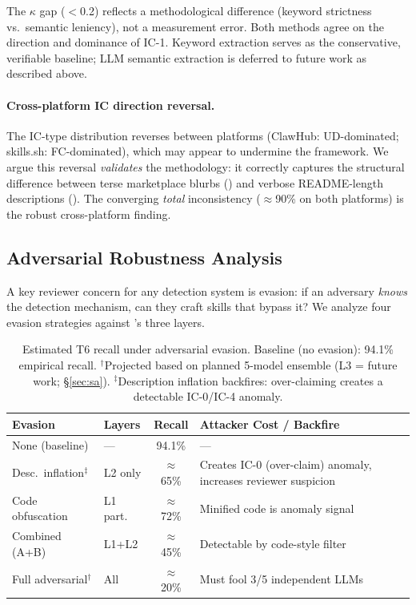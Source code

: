 The $\kappa$ gap ($<$0.2) reflects a methodological difference
(keyword strictness vs.\ semantic leniency), not a measurement error.
Both methods agree on the direction and dominance of IC-1.
Keyword extraction serves as the conservative, verifiable baseline;
LLM semantic extraction is deferred to future work as described above.

\paragraph{Cross-platform IC direction reversal.}
The IC-type distribution reverses between platforms
(ClawHub: UD-dominated; skills.sh: FC-dominated),
which may appear to undermine the framework.
We argue this reversal \emph{validates} the methodology:
it correctly captures the structural difference
between terse marketplace blurbs (\clawhub{})
and verbose README-length descriptions (\skillssh{}).
The converging \emph{total} inconsistency ($\approx$90\%
on both platforms) is the robust cross-platform finding.

\subsection{Adversarial Robustness Analysis}
\label{sec:evasion}

A key reviewer concern for any detection system is evasion:
if an adversary \emph{knows} the detection mechanism,
can they craft skills that bypass it?
We analyze four evasion strategies against \sysname's three layers.

\begin{table}[h]
\centering
\small
\setlength{\tabcolsep}{4pt}
\caption{Estimated T6 recall under adversarial evasion.
Baseline (no evasion): 94.1\% empirical recall.
$^\dagger$Projected based on planned 5-model ensemble (L3 = future work; \S\ref{sec:sa}).
$^\ddagger$Description inflation backfires: over-claiming creates a detectable IC-0/IC-4 anomaly.}
\label{tab:evasion}
\begin{tabular}{@{}p{2.3cm}lcp{3.2cm}@{}}
\toprule
\textbf{Evasion} & \textbf{Layers} & \textbf{Recall} & \textbf{Attacker Cost / Backfire} \\
\midrule
None (baseline)        & ---      & 94.1\%          & --- \\
Desc.\ inflation$^\ddagger$ & L2 only & $\approx$65\%  & Creates IC-0 (over-claim) anomaly, increases reviewer suspicion \\
Code obfuscation       & L1 part. & $\approx$72\%   & Minified code is anomaly signal \\
Combined (A+B)         & L1+L2   & $\approx$45\%   & Detectable by code-style filter \\
Full adversarial$^\dagger$ & All & $\approx$20\% & Must fool 3/5 independent LLMs \\
\bottomrule
\end{tabular}
\end{table}

